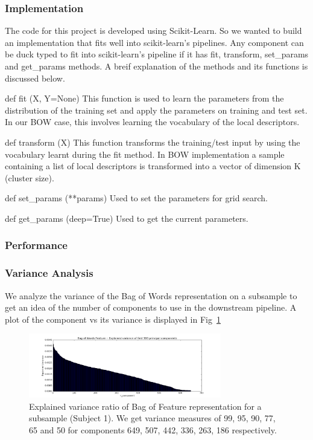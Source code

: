 \documentclass[final,leqno,onefignum,onetabnum]{siamltexmm}
\begin{document}
\subsubsection{Implementation}
The code for this project is developed using Scikit-Learn\cite{website:sklearn}.  So we wanted to build an implementation that fits well into scikit-learn's pipelines.
Any component can be duck typed to fit into scikit-learn's pipeline if it has fit, transform, set\_params and get\_params methods.  A breif explanation of the methods and its functions is discussed below.
\begin{description}
  \item{def fit (X, Y=None)}  This function is used to learn the parameters from the distribution of the training set and apply the parameters on training and test set.  In our BOW case, this involves learning the vocabulary of the local descriptors.
  \item{def transform (X)}  This function transforms the training/test input by using the vocabulary learnt during the fit method.  In BOW implementation a sample containing a list of local descriptors is transformed into a vector of dimension K (cluster size).
  \item{def set\_params (**params)} Used to set the parameters for grid search.
  \item{def get\_params (deep=True)} Used to get the current parameters.
\end{description}

\subsubsection{Performance}
\subsubsection{Variance Analysis}
We analyze the variance of the Bag of Words representation on a subsample to get an idea of the number of components to use in the downstream pipeline.  A plot of the component vs its variance is displayed in Fig~\ref{fig:bowf_variance}
\begin{figure}
  \centering
  \includegraphics[width=0.75\textwidth]{images/bowf_variance}
  \caption{Explained variance ratio of Bag of Feature representation for a subsample (Subject 1).  We get variance measures of 99, 95, 90, 77, 65 and 50 for components 649, 507, 442, 336, 263, 186 respectively.\label{fig:bowf_variance}} 
\end{figure}
\end{document}
